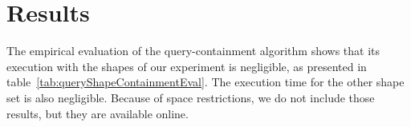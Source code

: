 \section{Results}

The empirical evaluation of the query-containment algorithm shows that its execution with the shapes of our experiment is negligible, as presented in table~\ref{tab:queryShapeContainmentEval}.
The execution time for the other shape set is also negligible. Because of space restrictions, we do not include those results, but they are available online.


